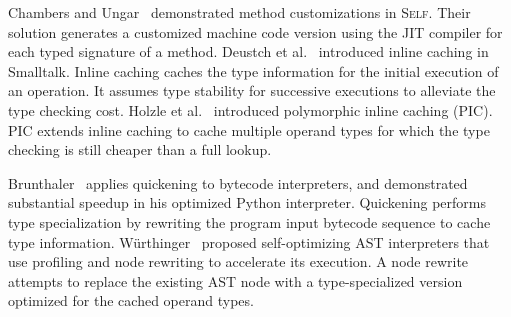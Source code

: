 Chambers and Ungar~\cite{Chambers+1989} demonstrated method customizations in \textsc{Self}.
Their solution generates a customized machine code version using the JIT compiler for each typed signature of a method.
Deustch et al.~\cite{Deutsch1984} introduced inline caching in Smalltalk.
Inline caching caches the type information for the initial execution of an operation.
It assumes type stability for successive executions to alleviate the type checking cost.
Holzle et al.~\cite{Holzle+1991} introduced polymorphic inline caching (PIC).
PIC extends inline caching to cache multiple operand types for which the type checking is still cheaper than a full lookup.

Brunthaler~\cite{Brunthaler2010inca} applies quickening to bytecode interpreters, and demonstrated substantial speedup in his optimized Python interpreter.
Quickening performs type specialization by rewriting the program input bytecode sequence to cache type information.
W\"{u}rthinger~\cite{Wurthinger+12} proposed self-optimizing AST interpreters that use profiling and node rewriting to accelerate its execution.
A node rewrite attempts to replace the existing AST node with a type-specialized version optimized for the cached operand types.

